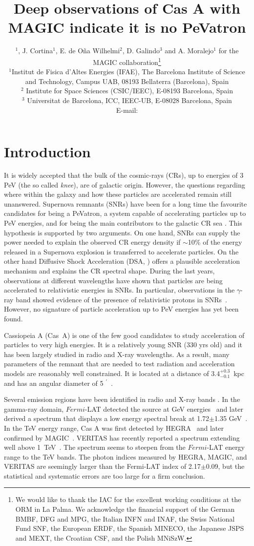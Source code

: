 \documentclass{PoS}
\title{Deep observations of Cas A with MAGIC indicate it is no PeVatron}
\author{\speaker{D. Guberman}$^{1}$, J. Cortina$^{1}$, E. de O\~na Wilhelmi$^{2}$, D. Galindo$^{3}$ and A. Moralejo$^{1}$ for the MAGIC collaboration\thanks{We would like to thank the IAC for the excellent working conditions at the ORM in La Palma. We acknowledge the financial support of the German BMBF, DFG and MPG, the Italian INFN and INAF, the Swiss National Fund SNF, the European ERDF, the Spanish MINECO, the Japanese JSPS and MEXT, the Croatian CSF, and the Polish MNiSzW.}\\
       $^{1}$Institut de Fisica d'Altes Energies (IFAE), The Barcelona Institute of Science and Technology, Campus UAB, 08193 Bellaterra (Barcelona), Spain\\
       $^{2}$ Institute for Space Sciences (CSIC/IEEC), E-08193 Barcelona, Spain \\
       $^{3}$ Universitat de Barcelona, ICC, IEEC-UB, E-08028 Barcelona, Spain \\
        E-mail: \email{dguberman@ifae.es}}
\newcommand\arcm{\ensuremath{^\prime}}
\begin{document}
\section{Introduction}\label{sect:intro}

It is widely accepted that the bulk of the cosmic-rays (CRs), up to energies of 3 PeV (the so called \textit{knee}), are of galactic origin. However, the questions regarding where within the galaxy and how these particles are accelerated remain still unanswered. Supernova remnants (SNRs) have been for a long time the favourite candidates for being a PeVatron, a system capable of accelerating particles up to PeV energies, and for being the main contributors to the galactic CR sea \cite{Berezhko_2003,bell_2013_2,Drury_2014}. This hypothesis is supported by two arguments. On one hand, SNRs can supply the power needed to explain the observed CR energy density if $\sim$10\% of the energy released in a Supernova explosion is transferred to accelerate particles. On the other hand Diffusive Shock Acceleration (DSA, \cite{bell_2013}) offers a plausible acceleration mechanism and explains the CR spectral shape. During the last years, observations at different wavelengths have shown that particles are being accelerated to relativistic energies in SNRs. In particular, observations in the $\gamma$-ray band showed evidence of the presence of relativistic protons in SNRs~\cite{ackermann_2013}. However, no signature of particle acceleration up to PeV energies has yet been found.

Cassiopeia A (Cas~A) is one of the few good candidates to study acceleration of particles to very high energies. It is a relatively young SNR (330 yrs old) and it has been largely studied in radio and X-ray wavelengths. As a result, many parameters of the remnant that are needed to test radiation and acceleration models are reasonably well constrained. It is located at a distance of 3.4$^{+0.3}_{-0.1}$~kpc and has an angular diameter of 5 \arcm{}~\cite{reed_1995}.

Several emission regions have been identified in radio and X-ray bands \cite{Lastochkin_1963,Medd_1965,Allen_1967,Parker_1968,Braude_1969, Hales_1995,Anderson_1991, Gotthelf_2001,suzaku_2009,Grefenstette_2015, integral_2016}. In the gamma-ray domain, $Fermi$-LAT detected the source at GeV energies~\cite{abdo_2010} and later derived a spectrum that displays a
low energy spectral break at 1.72$\pm$1.35 GeV~\cite{yuan_2013}. In the TeV energy range, Cas A was first detected by HEGRA~\cite{aharonian_2001} and later confirmed by MAGIC~\cite{albert_2007}. VERITAS has recently reported a spectrum extending well above 1~TeV~\cite{holder_2016}. The spectrum seems to steepen from the $Fermi$-LAT energy range to the TeV bands. The photon indices measured by HEGRA, MAGIC, and VERITAS are seemingly larger than the Fermi-LAT index of 2.17$\pm$0.09, but the statistical and systematic errors are too large for a firm conclusion.
\end{document}
